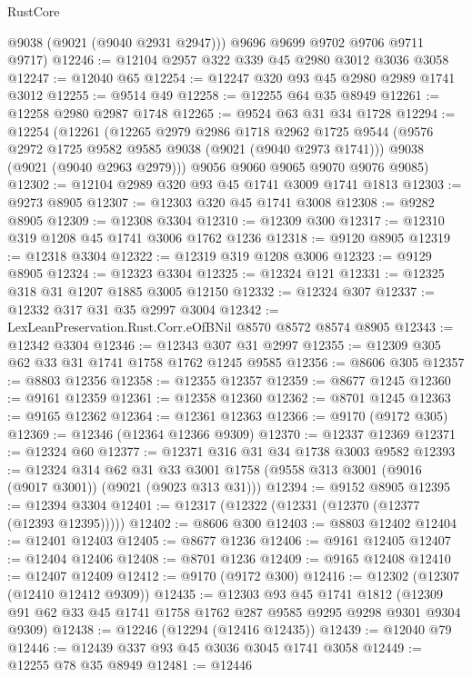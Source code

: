 \begin{lexlean}{RustCore}
\begin{coremodule}
        @9038
        (@9021 (@9040 @2931 @2947)))
      @9696
      @9699
      @9702
      @9706
      @9711
      @9717)
@12246 := @12104 @2957 @322 @339 @45 @2980 @3012 @3036 @3058
@12247 := @12040 @65
@12254 := @12247 @320 @93 @45 @2980 @2989 @1741 @3012
@12255 := @9514 @49
@12258 := @12255 @64 @35 @8949
@12261 := @12258 @2980 @2987 @1748
@12265 := @9524 @63 @31 @34 @1728
@12294 := @12254
    (@12261
      (@12265
        @2979
        @2986
        @1718
        @2962
        @1725
        @9544
        (@9576 @2972 @1725 @9582 @9585 @9038 (@9021 (@9040 @2973 @1741)))
        @9038
        (@9021 (@9040 @2963 @2979)))
      @9056
      @9060
      @9065
      @9070
      @9076
      @9085)
@12302 := @12104 @2989 @320 @93 @45 @1741 @3009 @1741 @1813
@12303 := @9273 @8905
@12307 := @12303 @320 @45 @1741 @3008
@12308 := @9282 @8905
@12309 := @12308 @3304
@12310 := @12309 @300
@12317 := @12310 @319 @1208 @45 @1741 @3006 @1762 @1236
@12318 := @9120 @8905
@12319 := @12318 @3304
@12322 := @12319 @319 @1208 @3006
@12323 := @9129 @8905
@12324 := @12323 @3304
@12325 := @12324 @121
@12331 := @12325 @318 @31 @1207 @1885 @3005 @12150
@12332 := @12324 @307
@12337 := @12332 @317 @31 @35 @2997 @3004
@12342 := LexLeanPreservation.Rust.Corr.eOfBNil @8570 @8572 @8574 @8905
@12343 := @12342 @3304
@12346 := @12343 @307 @31 @2997
@12355 := @12309 @305 @62 @33 @31 @1741 @1758 @1762 @1245 @9585
@12356 := @8606 @305
@12357 := @8803 @12356
@12358 := @12355 @12357
@12359 := @8677 @1245
@12360 := @9161 @12359
@12361 := @12358 @12360
@12362 := @8701 @1245
@12363 := @9165 @12362
@12364 := @12361 @12363
@12366 := @9170 (@9172 @305)
@12369 := @12346 (@12364 @12366 @9309)
@12370 := @12337 @12369
@12371 := @12324 @60
@12377 := @12371 @316 @31 @34 @1738 @3003 @9582
@12393 := @12324
    @314
    @62
    @31
    @33
    @3001
    @1758
    (@9558 @313 @3001 (@9016 (@9017 @3001)) (@9021 (@9023 @313 @31)))
@12394 := @9152 @8905
@12395 := @12394 @3304
@12401 := @12317 (@12322 (@12331 (@12370 (@12377 (@12393 @12395)))))
@12402 := @8606 @300
@12403 := @8803 @12402
@12404 := @12401 @12403
@12405 := @8677 @1236
@12406 := @9161 @12405
@12407 := @12404 @12406
@12408 := @8701 @1236
@12409 := @9165 @12408
@12410 := @12407 @12409
@12412 := @9170 (@9172 @300)
@12416 := @12302 (@12307 (@12410 @12412 @9309))
@12435 := @12303
    @93
    @45
    @1741
    @1812
    (@12309 @91 @62 @33 @45 @1741 @1758 @1762 @287 @9585 @9295 @9298 @9301 @9304 @9309)
@12438 := @12246 (@12294 (@12416 @12435))
@12439 := @12040 @79
@12446 := @12439 @337 @93 @45 @3036 @3045 @1741 @3058
@12449 := @12255 @78 @35 @8949
@12481 := @12446

\end{coremodule}
\end{lexlean}
